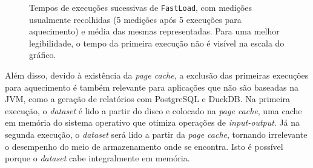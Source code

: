 \documentclass[11pt, a4paper]{article}
\begin{document}
\begin{figure}[H]
    \center
    \vspace{-0.5\baselineskip}
    \caption{
        \onehalfspacing
        Tempos de execuções sucessivas de \texttt{FastLoad}, com medições usualmente recolhidas (5
        medições após 5 execuções para aquecimento) e média das mesmas representadas. Para uma
        melhor legibilidade, o tempo da primeira execução não é visível na escala do gráfico.
    }
    \label{jvm-warmup-times}
\end{figure}

Além disso, devido à existência da \emph{page cache}, a exclusão das primeiras execuções para
aquecimento é também relevante para aplicações que não são baseadas na JVM, como a geração de
relatórios com PostgreSQL e DuckDB. Na primeira execução, o \emph{dataset} é lido a partir do disco
e colocado na \emph{page cache}, uma cache em memória do sistema operativo que otimiza operações de
\emph{input-output}. Já na segunda execução, o \emph{dataset} será lido a partir da \emph{page
cache}, tornando irrelevante o desempenho do meio de armazenamento onde se encontra. Isto é possível
porque o \emph{dataset} cabe integralmente em memória.
\end{document}
